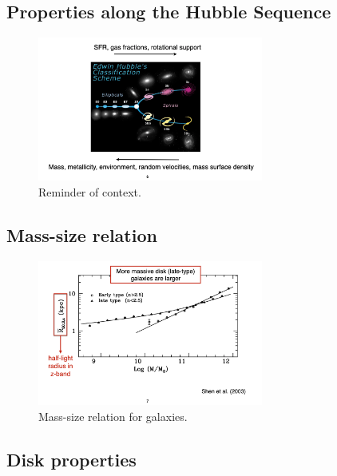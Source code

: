 \documentclass{article}
\begin{document}
\subsection{Properties along the Hubble Sequence}

\begin{figure}
    \centering
    \includegraphics[width=0.66\textwidth]{figs/Screen Shot 2021-10-22 at 9.51.35 AM.png}
    \caption{Reminder of context.}
    \label{fig:hubble_tuning_fork}
\end{figure}

\subsection{Mass-size relation}

\begin{figure}
    \centering
    \includegraphics[width=0.66\textwidth]{figs/Screen Shot 2021-10-22 at 9.52.30 AM.png}
    \caption{Mass-size relation for galaxies.}
    \label{fig:massiszerelation}
\end{figure}

\subsection{Disk properties}
\end{document}
